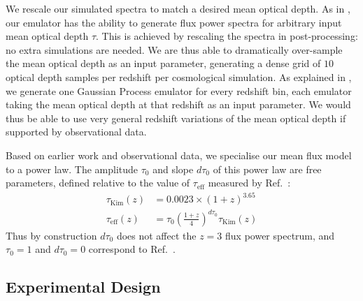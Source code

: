 \documentclass[a4paper,11pt]{article}
\begin{document}
We rescale our simulated spectra to match a desired mean optical depth. As in \cite{Bird:2019}, our emulator has the ability to generate flux power spectra for arbitrary input mean optical depth $\tau$. This is achieved by rescaling the spectra in post-processing: no extra simulations are needed. We are thus able to dramatically over-sample the mean optical depth as an input parameter, generating a dense grid of $10$ optical depth samples per redshift per cosmological simulation. As explained in \cite{Bird:2019}, we generate one Gaussian Process emulator for every redshift bin, each emulator taking the mean optical depth at that redshift as an input parameter. We would thus be able to use very general redshift variations of the mean optical depth if supported by observational data.

Based on earlier work and observational data, we specialise our mean flux model to a power law. The amplitude $\tau_0$ and slope $d\tau_0$ of this power law are free parameters, defined relative to the value of $\tau_\mathrm{eff}$ measured by Ref.~\cite{Kim:2007}:
\begin{align}
\tau_\mathrm{Kim}(z) &= 0.0023 \times (1 + z)^{3.65} \\
 \tau_\mathrm{eff}(z) &= \tau_0 \left(\frac{1+z}{4}\right)^{d\tau_0}  \tau_\mathrm{Kim}(z)
 \label{eq:meanflux}
\end{align}
Thus by construction $d\tau_0$ does not affect the $z=3$ flux power spectrum, and $\tau_0 = 1$ and $d\tau_0 = 0$ correspond to Ref.~\cite{Kim:2007}.




\subsection{Experimental Design}
\label{sec:latinhypercube}
\end{document}
